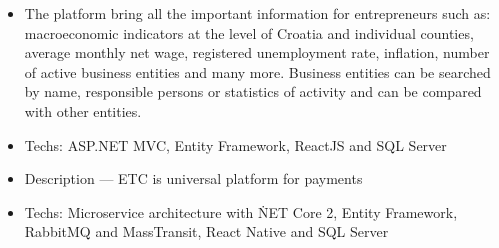 \documentclass[10pt,a4paper]{altacv}
\begin{document}
\medskip





\begin{itemize}
  \item \small{The platform bring all the important information for entrepreneurs such as: macroeconomic indicators at the level of Croatia and individual counties, average monthly net wage, registered unemployment rate, inflation, number of active business entities and many more. Business entities can be searched by name, responsible persons or statistics of activity and can be compared with other entities.}
  \item Techs: ASP.NET MVC, Entity Framework, ReactJS and SQL Server
\end{itemize}

\divider

%



\begin{itemize}
  \item Description --- ETC is universal platform for payments
  \item Techs: Microservice architecture with \.NET Core 2, Entity Framework, RabbitMQ and MassTransit, React Native and SQL Server 
\end{itemize}




\divider


\divider





\end{document}
